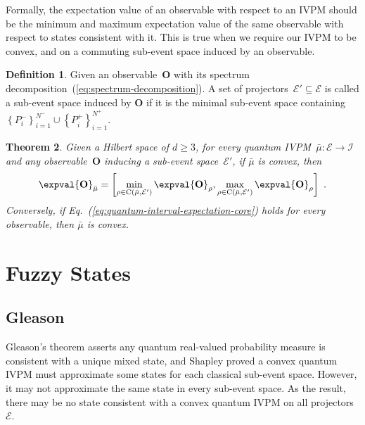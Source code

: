 \documentclass[english,reprint, aps, prl,superscriptaddress, showpacs,
showkeys, longbibliography, amsmath, amssymb]{revtex4-1}
\theoremstyle{plain}
\newtheorem{thm}{Theorem}
\theoremstyle{definition}
\newtheorem{definition}[thm]{Definition}
\newcommand{\events}{\ensuremath{\mathcal{E}}}
\newcommand{\coreBorn}{\ensuremath{\mathrm{C}}}
\begin{document}
Formally, the expectation value of an observable with respect to an
IVPM should be the minimum and maximum expectation value of the same
observable with respect to states consistent with it. This is true
when we require our IVPM to be convex, and on a commuting sub-event
space induced by an observable.

\begin{definition}Given an observable~$\mathbf{O}$ with its spectrum
decomposition~(\ref{eq:spectrum-decomposition}). A set of projectors~$\events'\subseteq\events$
is called a sub-event space induced by $\mathbf{O}$ if it is the
minimal sub-event space containing $\left\{ P_{i}^{-}\right\} _{i=1}^{N^{-}}\cup\left\{ P_{i}^{+}\right\} _{i=1}^{N^{+}}$.\end{definition}

\begin{thm}Given a Hilbert space of $d\ge3$, for every quantum IVPM~$\bar{\mu}:\events\rightarrow\mathscr{I}$
and any observable~$\mathbf{O}$ inducing a sub-event space~$\events'$,
if $\bar{\mu}$ is convex, then
\begin{equation}
\expval{\mathbf{O}}_{\bar{\mu}}=\left[\min_{\rho\in\coreBorn\left(\bar{\mu},\events'\right)}\expval{\mathbf{O}}_{\rho},\max_{\rho\in\coreBorn\left(\bar{\mu},\events'\right)}\expval{\mathbf{O}}_{\rho}\right]\textrm{ .}\label{eq:quantum-interval-expectation-core}
\end{equation}
Conversely, if Eq.~(\ref{eq:quantum-interval-expectation-core})
holds for every observable, then $\bar{\mu}$ is convex.\end{thm}

\section{Fuzzy States} 

\subsection{Gleason}

Gleason's theorem asserts any quantum real-valued probability measure
is consistent with a unique mixed state, and Shapley proved a convex
quantum IVPM must approximate some states for each classical sub-event
space. However, it may not approximate the same state in every sub-event
space. As the result, there may be no state consistent with a convex
quantum IVPM on all projectors~$\events$.
\end{document}
